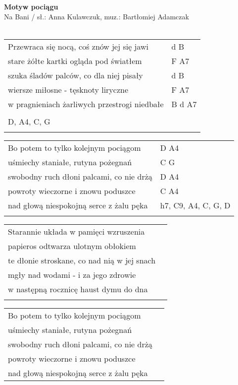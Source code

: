 \documentclass[a5paper]{article}
\begin{document}


\noindent
\fontsize{12pt}{15pt}\selectfont
\textbf{Motyw pociągu} \\
\fontsize{8pt}{10pt}\selectfont
Na Bani / sł.: Anna Kulawczuk, muz.: Bartłomiej Adamczak\\ \\
\fontsize{10pt}{12pt}\selectfont
{}
\begin{tabular}{@{}p{7.70cm}p{3cm}@{}}
\noindent
Przewraca się nocą, coś znów jej się jawi & d B \\
stare żółte kartki ogląda pod światłem & F A7 \\
szuka śladów palców, co dla niej pisały & d B \\
wiersze miłosne - tęsknoty liryczne & F A7 \\
w pragnieniach żarliwych przestrogi niedbałe & B d A7 \\ \\

D, A4, C, G \\ \\
\end{tabular}

\noindent
\begin{tabular}{@{}p{6.70cm}p{3cm}@{}}
Bo potem to tylko kolejnym pociągom & D A4 \\
uśmiechy staniałe, rutyna pożegnań & C G \\
swobodny ruch dłoni palcami, co nie drżą & D A4 \\
powroty wieczorne i znowu poduszce & C A4 \\
nad głową niespokojną serce z żalu pęka & h7, C9, A4, C, G, D \\ \\
\end{tabular}

\noindent
\begin{tabular}{@{}p{8.70cm}p{3cm}@{}}
Starannie układa w pamięci wzruszenia \\
papieros odtwarza ulotnym obłokiem \\
te dłonie stroskane, co nad nią w jej snach \\
mgły nad wodami - i za jego zdrowie \\
w następną rocznicę haust dymu do dna \\ \\	
\end{tabular}

\noindent
\begin{tabular}{@{}p{7.70cm}p{3cm}@{}}
Bo potem to tylko kolejnym pociągom \\
uśmiechy staniałe, rutyna pożegnań \\
swobodny ruch dłoni palcami, co nie drżą \\
powroty wieczorne i znowu poduszce \\
nad głową niespokojną serce z żalu pęka	\\
\end{tabular}
\end{document}
